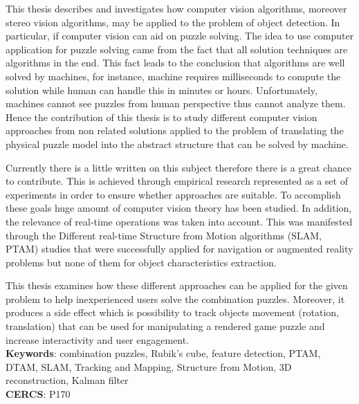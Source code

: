 \documentclass[../main]{subfiles}
\begin{document}
This thesis describes and investigates how computer vision algorithms, moreover stereo vision algorithms, may be applied to the problem of object detection. In particular, if computer vision can aid on puzzle solving. The idea to use computer application for puzzle solving came from the fact that all solution techniques are algorithms in the end. This fact leads to the conclusion that algorithms are well solved by machines, for instance, machine requires milliseconds to compute the solution while human can handle this in minutes or hours. Unfortunately, machines cannot see puzzles from human perspective thus cannot analyze them. Hence the contribution of this thesis is to study different computer vision approaches from non related solutions applied to the problem of translating the physical puzzle model into the abstract structure that can be solved by machine. 

Currently there is a little written on this subject therefore there is a great chance to contribute. This is achieved through empirical research represented as a set of experiments in order to ensure whether approaches are suitable. To accomplish these goals huge amount of computer vision theory has been studied. In addition, the relevance of real-time operations was taken into account. This was manifested through the Different real-time Structure from Motion algorithms (SLAM, PTAM) studies that were successfully applied for navigation or augmented reality problems but none of them for object characteristics extraction.

This thesis examines how these different approaches can be applied for the given problem to help inexperienced users solve the combination puzzles. Moreover, it produces a side effect which is possibility to track objects movement (rotation, translation) that can be used for manipulating a rendered game puzzle and increase interactivity and user engagement. \vspace{5mm} \\ \textbf{Keywords}: combination puzzles, Rubik's cube, feature detection, PTAM, DTAM, SLAM, Tracking and Mapping, Structure from Motion, 3D reconstruction, Kalman filter \\
\textbf{CERCS}: P170
\end{document}
